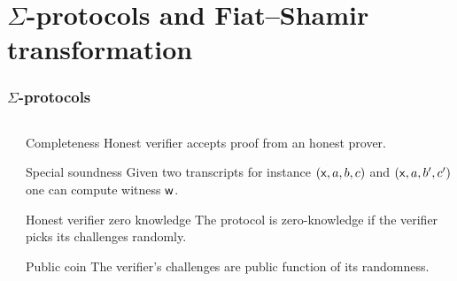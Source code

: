 \documentclass[aspectratio=169]{beamer}
\begin{document}
\section*{$\Sigma$-protocols and Fiat--Shamir transformation}
\begin{frame}
  \frametitle{$\Sigma$-protocols}
  \begin{columns}
    \begin{column}{.3\linewidth}
    \end{column}
    \begin{column}{.6\linewidth}
      \begin{block}{Completeness}
        Honest verifier accepts proof from an honest prover.
      \end{block}
      \begin{block}{Special soundness}
        Given two transcripts for instance $(\mathsf{x}, a, b, c)$ and
        $(\mathsf{x}, a, b', c')$ one can compute witness $\mathsf{w}$.
      \end{block}
      \begin{block}{Honest verifier zero knowledge}
        The protocol is zero-knowledge if the verifier picks its challenges randomly.
      \end{block}
      \begin{block}{Public coin}
        The verifier's challenges are public function of its randomness.
      \end{block}
    \end{column}
  \end{columns}
\end{frame}
\end{document}
